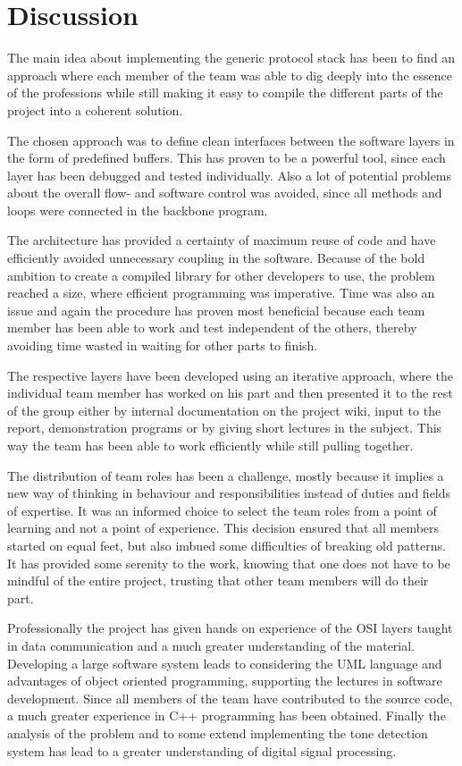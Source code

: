 \chapter{Discussion}\label{chap:discussion}
The main idea about implementing the generic protocol stack has been to find an approach
where each member of the team was able to dig deeply into the essence of the
professions while still making it easy to compile the different parts of the
project into a coherent solution.

The chosen approach was to define clean interfaces between the software layers
in the form of predefined buffers. This has proven to be a powerful tool, since
each layer has been debugged and tested individually. Also a lot of potential
problems about the overall flow- and software control was avoided, since all
methods and loops were connected in the backbone program.

The architecture has provided a certainty of maximum reuse of
code and have efficiently avoided unnecessary coupling in the software. Because
of the bold ambition to create a compiled library for other developers to use, the problem reached a
size, where efficient programming was imperative. Time was also an issue and
again the procedure has proven most beneficial because each team member has been
able to work and test independent of the others, thereby avoiding time wasted in
waiting for other parts to finish.

The respective layers have been developed using an iterative approach, where
the individual team member has worked on his part and then presented it to the rest
of the group either by internal documentation on the project wiki, input to the
report, demonstration programs or by giving short lectures in the subject. This
way the team has been able to work efficiently while still pulling together.

The distribution of team roles has been a challenge, mostly because it implies a
new way of thinking in behaviour and responsibilities instead of duties and
fields of expertise. It was an informed choice to select the team roles from a
point of learning and not a point of experience. This decision ensured that
all members started on equal feet, but also imbued some difficulties of breaking
old patterns. It has provided some serenity to the work, knowing that one does
not have to be mindful of the entire project, trusting that other team members
will do their part.

Professionally the project has given hands on experience of the OSI layers
taught in data communication and a much greater understanding of the material.
Developing a large software system leads to considering the UML language and
advantages of object oriented programming, supporting the lectures in software
development. Since all members of the team have contributed to the source code,
a much greater experience in C++ programming has been obtained. Finally the
analysis of the problem and to some extend implementing the tone detection
system has lead to a greater understanding of digital signal processing.
